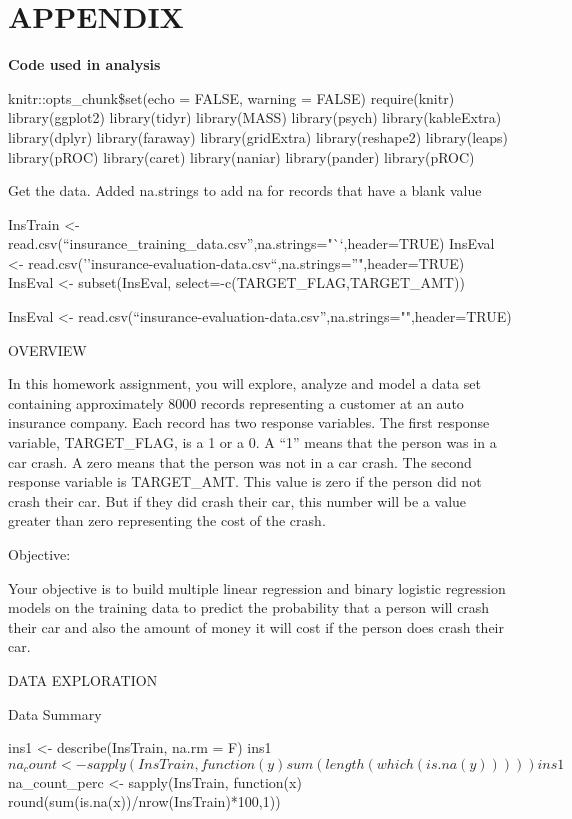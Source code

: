 \documentclass[]{article}
\begin{document}
\hypertarget{appendix}{%
\section{APPENDIX}\label{appendix}}

\textbf{Code used in analysis}

knitr::opts\_chunk\$set(echo = FALSE, warning = FALSE) require(knitr)
library(ggplot2) library(tidyr) library(MASS) library(psych)
library(kableExtra) library(dplyr) library(faraway) library(gridExtra)
library(reshape2) library(leaps) library(pROC) library(caret)
library(naniar) library(pander) library(pROC)

Get the data. Added na.strings to add na for records that have a blank
value

InsTrain \textless-
read.csv(``insurance\_training\_data.csv'',na.strings="``,header=TRUE)
InsEval \textless-
read.csv(''insurance-evaluation-data.csv``,na.strings=''",header=TRUE)
InsEval \textless- subset(InsEval, select=-c(TARGET\_FLAG,TARGET\_AMT))

InsEval \textless-
read.csv(``insurance-evaluation-data.csv'',na.strings="",header=TRUE)

OVERVIEW

In this homework assignment, you will explore, analyze and model a data
set containing approximately 8000 records representing a customer at an
auto insurance company. Each record has two response variables. The
first response variable, TARGET\_FLAG, is a 1 or a 0. A ``1'' means that
the person was in a car crash. A zero means that the person was not in a
car crash. The second response variable is TARGET\_AMT. This value is
zero if the person did not crash their car. But if they did crash their
car, this number will be a value greater than zero representing the cost
of the crash.

Objective:

Your objective is to build multiple linear regression and binary
logistic regression models on the training data to predict the
probability that a person will crash their car and also the amount of
money it will cost if the person does crash their car.

DATA EXPLORATION

Data Summary

ins1 \textless- describe(InsTrain, na.rm = F)
ins1\(na_count <- sapply(InsTrain, function(y) sum(length(which(is.na(y))))) ins1\)na\_count\_perc
\textless- sapply(InsTrain, function(x)
round(sum(is.na(x))/nrow(InsTrain)*100,1))
\end{document}
